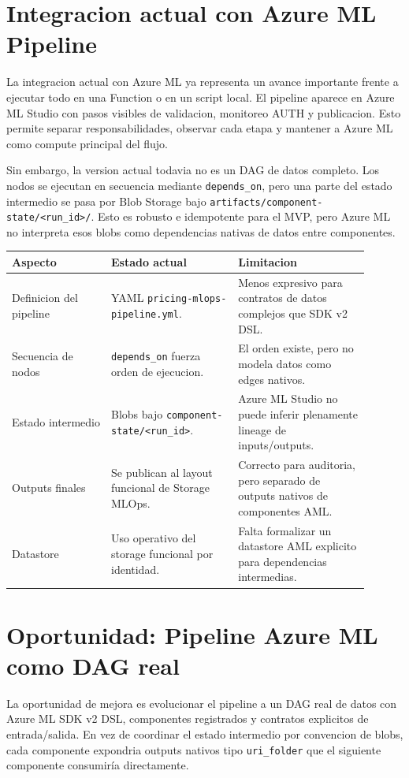 \documentclass[11pt,letterpaper]{article}
\newcommand{\code}[1]{\texttt{\small #1}}
\begin{document}
\section*{Integracion actual con Azure ML Pipeline}

La integracion actual con Azure ML ya representa un avance importante frente a ejecutar todo en una Function o en un script local. El pipeline aparece en Azure ML Studio con pasos visibles de validacion, monitoreo AUTH y publicacion. Esto permite separar responsabilidades, observar cada etapa y mantener a Azure ML como compute principal del flujo.

Sin embargo, la version actual todavia no es un DAG de datos completo. Los nodos se ejecutan en secuencia mediante \code{depends\_on}, pero una parte del estado intermedio se pasa por Blob Storage bajo \code{artifacts/component-state/<run\_id>/}. Esto es robusto e idempotente para el MVP, pero Azure ML no interpreta esos blobs como dependencias nativas de datos entre componentes.

\begin{longtable}{p{0.25\linewidth}p{0.32\linewidth}p{0.33\linewidth}}
\toprule
\textbf{Aspecto} & \textbf{Estado actual} & \textbf{Limitacion}\\
\midrule
\endhead
Definicion del pipeline & YAML \code{pricing-mlops-pipeline.yml}. & Menos expresivo para contratos de datos complejos que SDK v2 DSL.\\
Secuencia de nodos & \code{depends\_on} fuerza orden de ejecucion. & El orden existe, pero no modela datos como edges nativos.\\
Estado intermedio & Blobs bajo \code{component-state/<run\_id>}. & Azure ML Studio no puede inferir plenamente lineage de inputs/outputs.\\
Outputs finales & Se publican al layout funcional de Storage MLOps. & Correcto para auditoria, pero separado de outputs nativos de componentes AML.\\
Datastore & Uso operativo del storage funcional por identidad. & Falta formalizar un datastore AML explicito para dependencias intermedias.\\
\bottomrule
\end{longtable}

\section*{Oportunidad: Pipeline Azure ML como DAG real}

La oportunidad de mejora es evolucionar el pipeline a un DAG real de datos con Azure ML SDK v2 DSL, componentes registrados y contratos explicitos de entrada/salida. En vez de coordinar el estado intermedio por convencion de blobs, cada componente expondria outputs nativos tipo \code{uri\_folder} que el siguiente componente consumiría directamente.
\end{document}
